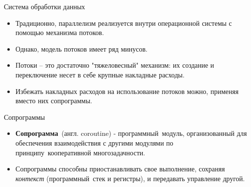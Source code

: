 
{
\begin{frame}[noframenumbering]
		\titlepage
\end{frame}
}

\begin{frame}{Система обработки данных}
	\begin{itemize}
	\item Традиционно, параллелизм реализуется внутри операционной системы с помощью механизма потоков.
	\item Однако, модель потоков имеет ряд минусов. 
	\item Потоки -- это достаточно "тяжеловесный" механизм: их создание и переключение несет в себе крупные накладные расходы. 
	\item Избежать накладных расходов на использование потоков можно, применяя вместо них сопрограммы. 
	\end{itemize}
\end{frame}

\begin{frame}{Сопрограммы}
	\begin{itemize}
		\item \textbf{Сопрограмма} (англ. coroutine) - программный модуль, организованный для обеспечения взаимодействия с другими модулями по принципу кооперативной многозадачности.
		
		\item Сопрограммы способны приостанавливать свое выполнение, сохраняя
		\textit{контекст} (программный стек и регистры), и передавать управление другой.
	\end{itemize}
\end{frame}

